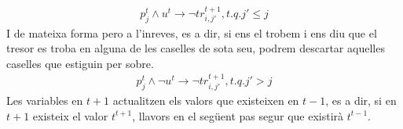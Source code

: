 \begin{gather}
p_j^t \wedge u^t \rightarrow \neg tr_{i, j'}^{t+1}, t.q. j' \leq j
\end{gather}
I de mateixa forma pero a l'inreves, es a dir, si ens el trobem i ens diu que el tresor es troba en alguna de les caselles de sota seu, podrem descartar aquelles caselles que estiguin per sobre.
\begin{gather}
p_j^t \wedge \neg u^t \rightarrow \neg tr_{i, j'}^{t+1}, t.q. j' > j
\end{gather}
Les variables en $t + 1$ actualitzen els valors que existeixen en $t-1$, es a dir, si 
en $t+1$ existeix el valor $t^{t+1}$, llavors en el següent pas segur que existirà $t^{t-1}$.\\
